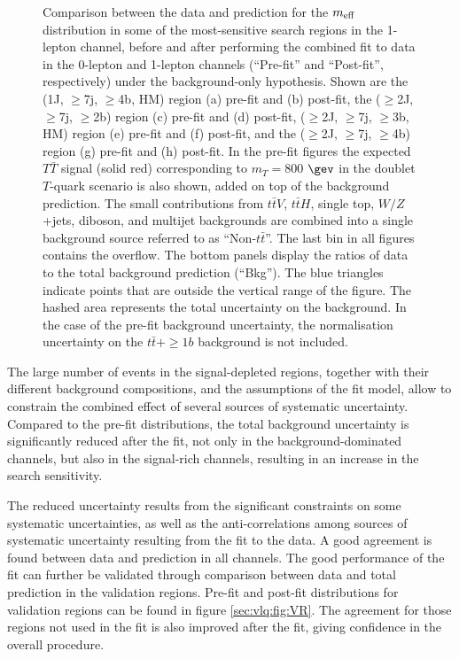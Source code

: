 \begin{figure}[p!]
\begin{subfigure}{0.24\textwidth}
  \caption{}
  \label{}
\end{subfigure}
\captionsetup{width=0.85\textwidth} \caption{\small Comparison between the data and prediction for the $m_{\rm eff}$ distribution in some of the most-sensitive search regions in the 1-lepton channel,
before and after performing the combined fit to data in the 0-lepton and 1-lepton channels (``Pre-fit'' and ``Post-fit'', respectively) under the background-only hypothesis. Shown are the (1J, $\geq$7j, $\geq$4b, HM) region (a) pre-fit and (b) post-fit, the ($\geq$2J, $\geq$7j, $\geq$2b) region (c) pre-fit and (d) post-fit, ($\geq$2J, $\geq$7j, $\geq$3b, HM) region (e) pre-fit and (f) post-fit,  and the ($\geq$2J, $\geq$7j, $\geq$4b) region (g) pre-fit and (h) post-fit.
In the pre-fit figures the expected $T\bar{T}$ signal (solid red) corresponding to $m_{T}=800$ $\gev$ in the doublet $T$-quark scenario is also shown, added on top of the background prediction. The small contributions from $t\bar{t}V$, $t\bar{t} H$, single top, $W/Z$+jets, diboson, and multijet backgrounds are combined into a single background source  referred to as ``Non-$t\bar{t}$''. The last bin in all figures contains the overflow. The bottom panels display the ratios of data to the total background prediction (``Bkg''). The blue triangles indicate points that are outside the vertical range of the figure. The hashed area represents the total uncertainty on the background. In the case of the pre-fit background uncertainty, the normalisation uncertainty on the $t\bar{t}+\ge1b$ background is not included.}
\label{sec:vlq:fig:meff3}
\end{figure}




The large number of events in the signal-depleted regions, together with their different background compositions, and the assumptions of the fit model, allow to constrain the combined effect of several sources of systematic uncertainty. Compared to the pre-fit distributions, the total background uncertainty is significantly reduced after the fit, not only in the background-dominated channels, but also in the signal-rich channels, resulting in an increase in the search sensitivity.\par
The reduced uncertainty results from the significant constraints on some systematic uncertainties, as well as the anti-correlations among sources of systematic uncertainty resulting from the fit to the data. A good agreement is found between data and prediction in all channels. The good performance of the fit can further be validated through comparison between data and total prediction in the validation regions. Pre-fit and post-fit distributions for validation regions can be found in figure \ref{sec:vlq:fig:VR}. The agreement for those regions not used in the fit is also improved after the fit, giving confidence in the overall procedure. 


